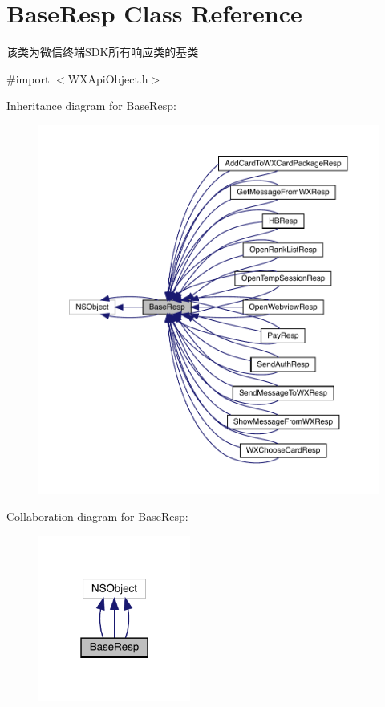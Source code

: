 \hypertarget{interface_base_resp}{}\section{Base\+Resp Class Reference}
\label{interface_base_resp}


该类为微信终端\+S\+D\+K所有响应类的基类  




{\ttfamily \#import $<$W\+X\+Api\+Object.\+h$>$}



Inheritance diagram for Base\+Resp\+:\nopagebreak
\begin{figure}[H]
\begin{center}
\leavevmode
\includegraphics[width=350pt]{interface_base_resp__inherit__graph}
\end{center}
\end{figure}


Collaboration diagram for Base\+Resp\+:\nopagebreak
\begin{figure}[H]
\begin{center}
\leavevmode
\includegraphics[width=142pt]{interface_base_resp__coll__graph}
\end{center}
\end{figure}
